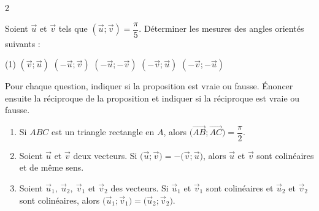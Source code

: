 \documentclass[a4paper,12pt]{article}
\begin{document}
\begin{multicols}{2}
      \newpage
      \begin{exercice}[title=Exercice 13 $\star$ { [Représenter] }]{}{}
      Soient \(\vec{u}\) et \(\vec{v}\) tels que \((\vec{u} ; \vec{v}) = \dfrac{\pi}{5}\). Déterminer les mesures des angles orientés suivants :
      \begin{tasks}[style=itemize](1)
        \task \((\vec{v} ; \vec{u})\)
        \task \((-\vec{u} ; \vec{v})\)
        \task \((-\vec{u} ; -\vec{v})\)
        \task \((-\vec{v} ; \vec{u})\)
        \task \((-\vec{v} ; -\vec{u})\)
      \end{tasks}
      \end{exercice}
      
      \begin{exercice}[title=Exercice 14 $\star\star$ { [Raisonner] }]{}{}
      Pour chaque question, indiquer si la proposition est vraie ou fausse. Énoncer ensuite la réciproque de la proposition et indiquer si la réciproque est vraie ou fausse.
      \begin{enumerate}
        \item Si \(ABC\) est un triangle rectangle en \(A\), alors \(\bigl(\overrightarrow{AB} ; \overrightarrow{AC}\bigr) = \dfrac{\pi}{2}\).
        \item Soient \(\vec{u}\) et \(\vec{v}\) deux vecteurs. Si \(\bigl(\vec{u} ; \vec{v}\bigr) = -\bigl(\vec{v} ; \vec{u}\bigr)\), alors \(\vec{u}\) et \(\vec{v}\) sont colinéaires et de même sens.
        \item Soient \(\vec{u}_1,\ \vec{u}_2,\ \vec{v}_1\) et \(\vec{v}_2\) des vecteurs.  
        Si \(\vec{u}_1\) et \(\vec{v}_1\) sont colinéaires et \(\vec{u}_2\) et \(\vec{v}_2\) sont colinéaires, alors \(\bigl(\vec{u}_1 ; \vec{v}_1\bigr) = \bigl(\vec{u}_2 ; \vec{v}_2\bigr)\).
      \end{enumerate}
      \end{exercice}
      

\end{multicols}
\end{document}
